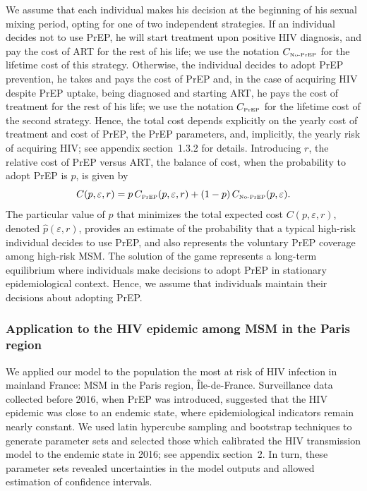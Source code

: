 \documentclass[preprint,review,12pt]{article}			%
\begin{document}
We assume that each individual makes his decision at the beginning of his sexual mixing period, opting for one of two independent strategies. If an individual decides not to use PrEP, he will start treatment upon positive HIV diagnosis, and pay the cost of ART for the rest of his life; we use the notation $C_{\text{\tiny No-PrEP}}$ for the lifetime cost of this strategy. Otherwise, the individual decides to adopt PrEP prevention, he takes and pays the cost of PrEP and, in the case of acquiring HIV despite PrEP uptake, being diagnosed and starting ART, he pays the cost of treatment for the rest of his life; we use the notation $C_{\text{\tiny PrEP}}$ for the lifetime cost of the second strategy. Hence, the total cost depends explicitly on the yearly cost of treatment and cost of PrEP, the PrEP parameters, and, implicitly, the yearly risk of acquiring HIV; see appendix section~1.3.2 for details. Introducing $r$, the relative cost of PrEP versus ART, the balance of cost, when the probability to adopt PrEP is $p$, is given by 
\begin{equation} \label{eq:C}
	C(p,\varepsilon, r) = p \, C_{\text{\tiny PrEP}}(p,\varepsilon, r) + (1- p) \, C_{\text{\tiny No-PrEP}}(p,\varepsilon).
\end{equation}
The particular value of $p$ that minimizes the total expected cost $C(p,\varepsilon, r)$, denoted $\hat{p}(\varepsilon, r)$, provides an estimate of the probability that a typical high-risk individual decides to use PrEP, and also represents the voluntary PrEP coverage among high-risk MSM. The solution of the game represents a long-term equilibrium where individuals make decisions to adopt PrEP in stationary epidemiological context. Hence, we assume that individuals maintain their decisions about adopting PrEP.


\subsubsection{Application to the HIV epidemic among MSM in the Paris region} \label{subsec:Paris}

We applied our model to the population the most at risk of HIV infection in mainland France: MSM in the Paris region, \^Ile-de-France. Surveillance data collected before 2016, when PrEP was introduced, suggested that the HIV epidemic was close to an endemic state, where epidemiological indicators remain nearly constant.\cite{Marty2019,RapportSPF2019} We used latin hypercube sampling and bootstrap techniques to generate parameter sets and selected those which calibrated the HIV transmission model to the endemic state in 2016;\cite{Marty2019} see appendix section~2. In turn, these parameter sets revealed uncertainties in the model outputs and allowed estimation of confidence intervals.
\end{document}
